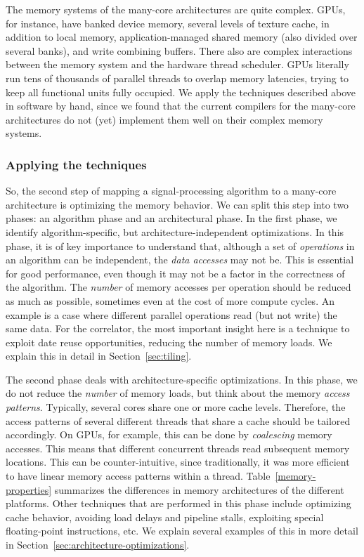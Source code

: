 \documentclass{article}
\begin{document}
The memory systems of the many-core architectures are quite
complex. GPUs, for instance, have banked device memory, several levels of texture cache,
in addition to local memory, application-managed
shared memory (also divided over several banks), and write combining buffers.
There also are complex interactions between the memory
system and the hardware thread scheduler.
GPUs literally run tens of thousands of parallel threads
to overlap memory latencies, trying to keep all functional units fully occupied.
We apply the techniques described
above in software by hand, since we found that the current compilers
for the many-core architectures do not (yet) implement them well on
their complex memory systems.



\subsubsection{Applying the techniques}

So, the second step of mapping a signal-processing algorithm to a many-core architecture
is optimizing the memory behavior. We can split this step into two phases:
an algorithm phase and an architectural phase.
In the first phase, we identify algorithm-specific, but
architecture-independent optimizations. 
In this phase, it is of key importance to understand that, although a
set of \emph{operations} in an algorithm can be independent, the \emph{data
  accesses} may not be.  This is essential for good performance, even though it may not be a
factor in the correctness of the algorithm. The \emph{number} of memory accesses per operation should
be reduced as much as possible, sometimes even at the cost of more
compute cycles. An example is a case
where different parallel operations read (but not write) the
same data.  For the correlator, the most important insight here
is a technique to exploit date reuse opportunities, reducing the number of memory
loads. We explain this in detail in Section~\ref{sec:tiling}.

The second phase deals with architecture-specific optimizations.
In this phase, we do not reduce the \emph{number} of memory loads, but think about the
memory \emph{access patterns}. Typically, several cores share one or
more cache levels. Therefore, the access patterns of several different
threads that share a cache should be tailored accordingly. On GPUs,
for example, this can be done by \emph{coalescing} memory accesses.
This means that different concurrent threads read subsequent memory
locations.  This can be counter-intuitive, since traditionally, it was
more efficient to have linear memory access patterns within a
thread. Table~\ref{memory-properties} summarizes the differences in
memory architectures of the different platforms.
Other techniques that are performed in this phase include optimizing cache
behavior, avoiding load delays and pipeline stalls, exploiting special floating-point instructions, etc.
We explain several examples of this in more detail in Section~\ref{sec:architecture-optimizations}.
\end{document}
